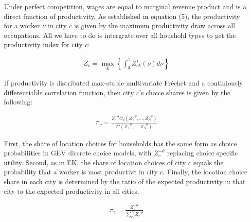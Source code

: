 \documentclass[10pt]{article}
\begin{document}
Under perfect competition, wages are equal to marginal revenue product and is a direct function of productivity. As established in equation (5), the productivity for a worker $\nu$ in city $c$ is given by the maximum productivity draw across all occupations. All we have to do is intergrate over all houshold types to get the productivity index for city $c$:

\begin{align}
    Z_c = \max_k \left\{ \int_{0}^{1} Z_{ck}^{\star} (\nu) d\nu \right\}
\end{align}

If productivity is distributed max-stable multivariate Fréchet and a continiously differentiable correlation function, then city $c$'s choice shares is given by the following:

\begin{align}
    \pi_c = \frac{Z_c^{-\theta} G_c(Z_1^{-\theta}, \dots, Z_N^{-\theta})}{G(Z_1^{-\theta}, \dots, Z_N^{-\theta})}
\end{align}

First, the share of location choices for households has the same form as choice probabilities in GEV discrete choice models, with $Z_c^{-\theta}$ replacing choice specific utility. Second, as in EK, the share of location choices of city $c$ equals the probability that a worker is most productive in city $c$. Finally, the location choice share in each city is determined by the ratio of the expected productivity in that city to the expected productivity in all cities.

\begin{align}
    \pi_c = \frac{Z_c^{-\theta}}{\sum_{c}^{N} Z_c^{-\theta}}
\end{align}


\end{document}
